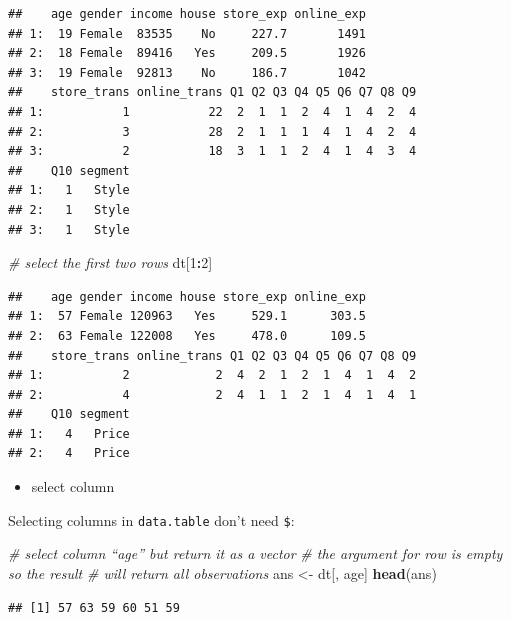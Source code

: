 \documentclass[12pt,]{krantz}
\makeatletter
\newenvironment{Shaded}{\begin{snugshade}}{\end{snugshade}}
\newcommand{\CommentTok}[1]{\textcolor[rgb]{0.37,0.37,0.37}{\textit{#1}}}
\newcommand{\DecValTok}[1]{\textcolor[rgb]{0.06,0.06,0.06}{#1}}
\newcommand{\KeywordTok}[1]{\textcolor[rgb]{0.27,0.27,0.27}{\textbf{#1}}}
\newcommand{\NormalTok}[1]{#1}
\newcommand{\OperatorTok}[1]{\textcolor[rgb]{0.43,0.43,0.43}{\textbf{#1}}}
\newcommand{\StringTok}[1]{\textcolor[rgb]{0.5,0.5,0.5}{#1}}
\providecommand{\tightlist}{%
  \setlength{\itemsep}{0pt}\setlength{\parskip}{0pt}}
\newenvironment{kframe}{%
\medskip{}
\setlength{\fboxsep}{.8em}
 \def\at@end@of@kframe{}%
 \ifinner\ifhmode%
  \def\at@end@of@kframe{\end{minipage}}%
  \begin{minipage}{\columnwidth}%
 \fi\fi%
 \def\FrameCommand##1{\hskip\@totalleftmargin \hskip-\fboxsep
 \colorbox{shadecolor}{##1}\hskip-\fboxsep
     \hskip-\linewidth \hskip-\@totalleftmargin \hskip\columnwidth}%
 \MakeFramed {\advance\hsize-\width
   \@totalleftmargin\z@ \linewidth\hsize
   \@setminipage}}%
 {\par\unskip\endMakeFramed%
 \at@end@of@kframe}
\renewenvironment{Shaded}{\begin{kframe}}{\end{kframe}}
\makeatother
\begin{document}
\begin{verbatim}
##    age gender income house store_exp online_exp
## 1:  19 Female  83535    No     227.7       1491
## 2:  18 Female  89416   Yes     209.5       1926
## 3:  19 Female  92813    No     186.7       1042
##    store_trans online_trans Q1 Q2 Q3 Q4 Q5 Q6 Q7 Q8 Q9
## 1:           1           22  2  1  1  2  4  1  4  2  4
## 2:           3           28  2  1  1  1  4  1  4  2  4
## 3:           2           18  3  1  1  2  4  1  4  3  4
##    Q10 segment
## 1:   1   Style
## 2:   1   Style
## 3:   1   Style
\end{verbatim}

\begin{Shaded}
\begin{Highlighting}[]
\CommentTok{# select the first two rows}
\NormalTok{dt[}\DecValTok{1}\OperatorTok{:}\DecValTok{2}\NormalTok{]}
\end{Highlighting}
\end{Shaded}

\begin{verbatim}
##    age gender income house store_exp online_exp
## 1:  57 Female 120963   Yes     529.1      303.5
## 2:  63 Female 122008   Yes     478.0      109.5
##    store_trans online_trans Q1 Q2 Q3 Q4 Q5 Q6 Q7 Q8 Q9
## 1:           2            2  4  2  1  2  1  4  1  4  2
## 2:           4            2  4  1  1  2  1  4  1  4  1
##    Q10 segment
## 1:   4   Price
## 2:   4   Price
\end{verbatim}

\begin{itemize}
\tightlist
\item
  select column
\end{itemize}

Selecting columns in \texttt{data.table} don't need \texttt{\$}:

\begin{Shaded}
\begin{Highlighting}[]
\CommentTok{# select column “age” but return it as a vector}
\CommentTok{# the argument for row is empty so the result}
\CommentTok{# will return all observations}
\NormalTok{ans <-}\StringTok{ }\NormalTok{dt[, age]}
\KeywordTok{head}\NormalTok{(ans)}
\end{Highlighting}
\end{Shaded}

\begin{verbatim}
## [1] 57 63 59 60 51 59
\end{verbatim}
\end{document}

